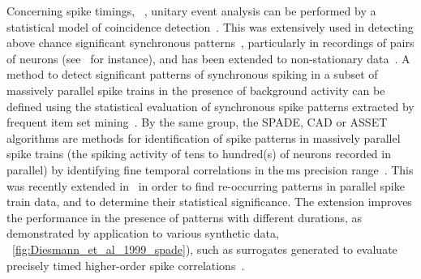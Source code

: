 \documentclass[brainsci, %
               review,accept,pdftex,moreauthors
               ]{Definitions/mdpi}
\newcommand{\ms}{\si{\milli\second}}%
\begin{document}
Concerning spike timings,~\citet{levakova_review_2015}  , unitary event analysis can be performed by a statistical model of coincidence detection~\citep{grun_unitary_2002-1}. This was extensively used in detecting above chance significant synchronous patterns~\citep{grun_unitary_2010}, particularly in recordings of pairs of neurons (see~\citep{riehle_spike_1997} for instance), and has been extended to non-stationary data~\citep{grun_unitary_2002}. A method to detect significant patterns of synchronous spiking in a subset of massively parallel spike trains in the presence of background activity can be defined using the statistical evaluation of synchronous spike patterns extracted by frequent item set mining~\citep{torre_statistical_2013}. By the same group, the SPADE, CAD or ASSET algorithms are methods for identification of spike patterns in massively parallel spike trains (the spiking activity of tens to hundred(s) of neurons recorded in parallel) by identifying fine temporal correlations in the$~\ms$ precision range~\citep{quaglio_methods_2018}. This was recently extended in~\citep{stella_3d-spade_2019} in order to find re-occurring patterns in parallel spike train data, and to determine their statistical significance. The extension improves the performance in the presence of patterns with different durations, as demonstrated by application to various synthetic data, ~\ref{fig:Diesmann_et_al_1999_spade}), such as surrogates generated to evaluate precisely timed higher-order spike correlations~\citep{stella_comparing_2022}.
\end{document}
